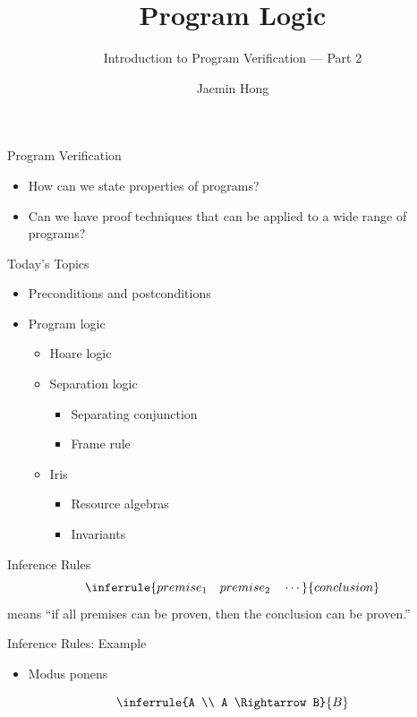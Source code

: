 \documentclass{beamer}
\title{Program Logic}
\subtitle{Introduction to Program Verification --- Part 2}
\author{Jaemin Hong}
\date{}
\begin{document}
\begin{frame}
  \titlepage
\end{frame}

\begin{frame}{Program Verification}
  \begin{itemize}
    \item How can we state properties of programs?
    \item Can we have proof techniques that can be applied to a wide range of programs?
  \end{itemize}
\end{frame}

\begin{frame}{Today's Topics}
  \begin{itemize}
    \item Preconditions and postconditions
    \item Program logic
      \begin{itemize}
        \item Hoare logic
        \item Separation logic
          \begin{itemize}
            \item Separating conjunction
            \item Frame rule
          \end{itemize}
        \item Iris
          \begin{itemize}
            \item Resource algebras
            \item Invariants
          \end{itemize}
      \end{itemize}
  \end{itemize}
\end{frame}

\begin{frame}{Inference Rules}
  \[
    \inferrule{premise_1 \quad premise_2 \quad \cdots}
              {conclusion}
  \]
  means ``if all premises can be proven, then the conclusion can be proven.''
\end{frame}

\begin{frame}{Inference Rules: Example}
  \begin{itemize}
    \item Modus ponens
  \end{itemize}
  \[
    \inferrule{A \\ A \Rightarrow B}{B}
  \]
\end{frame}
\end{document}
